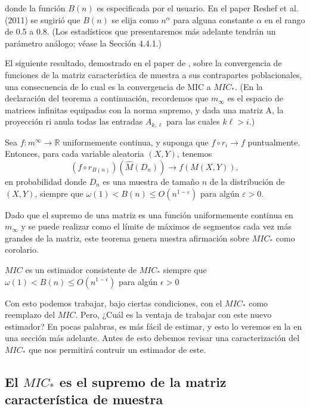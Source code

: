 	donde la funci\'on $B(n)$ es especificada por el usuario. En el paper Reshef et al. (2011) \cite{Reshef2011} se sugiri\'o que $B(n)$ se elija como $n^\alpha$ para alguna constante $\alpha$ en el rango de 0.5 a 0.8. (Los estad\'isticos que presentaremos m\'as adelante tendr\'an un par\'ametro an\'alogo; v\'ease la Secci\'on 4.4.1.)

	El siguiente resultado, demostrado en el paper de \cite{Reshef2016}, sobre la convergencia de funciones de la matriz caracter\'istica de muestra a sus contrapartes poblacionales, una consecuencia de lo cual es la convergencia de MIC a $MIC_*$. (En la declaraci\'on del teorema a continuaci\'on, recordemos que $m_\infty$ es el espacio de matrices infinitas equipadas con la norma supremo, y dada una matriz A, la proyecci\'on ri anula todas las entradas $A_{k, \ell}$ para las cuales $k\ell > i.$)

	\begin{thm}
		Sea $f: m^{\infty} \rightarrow \mathbb{R}$ uniformemente continua, y suponga que $f \circ r_i \rightarrow f$ puntualmente. Entonces, para cada variable aleatoria $(X, Y)$, tenemos
		$$
		\left(f \circ r_{B(n)}\right)\left(\widehat{M}\left(D_n\right)\right) \rightarrow f(M(X, Y)),
		$$
		en probabilidad donde $D_n$ es una muestra de tama\~no $n$ de la distribuci\'on de $(X, Y)$, siempre que $\omega(1)<B(n) \leq O\left(n^{1-\varepsilon}\right)$ para alg\'un $\varepsilon>0$.
	\end{thm}

	Dado que el supremo de una matriz es una funci\'on uniformemente continua en $m_\infty$ y se puede realizar como el l\'imite de m\'aximos de segmentos cada vez m\'as grandes de la matriz, este teorema genera nuestra afirmaci\'on sobre $MIC_*$ como corolario.

	\begin{cor}
		$MIC$ es un estimador consistente de $MIC_*$ siempre que $\omega(1) < B(n) \leq O(n^{1-\epsilon})$ para alg\'un $\epsilon > 0$
	\end{cor}

	Con esto podemos trabajar, bajo ciertas condiciones, con el $MIC_*$ como reemplazo del $MIC$. Pero, ¿Cu\'al es la ventaja de trabajar con este nuevo estimador? En pocas palabras, es m\'as f\'acil de estimar, y esto lo veremos en la en una secci\'on m\'as adelante. Antes de esto debemos revisar una caracterizaci\'on del $MIC_*$ que nos permitir\'a contruir un estimador de este.

	\subsection[El MIC star es el supremo de la matriz caracteristica de muestra]{El $MIC_*$ es el supremo de la matriz caracter\'istica de muestra}


